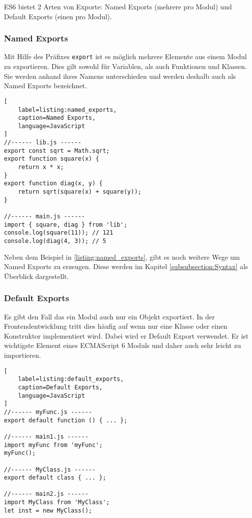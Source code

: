 ES6 bietet 2 Arten von Exporte: Named Exports (mehrere pro Modul) und Default Exports (einen pro Modul). \autocite{Rauschmayer2014}

\subsubsection{Named Exports}
\label{subsubsection:named_exports}

Mit Hilfe des Präfixes \lstinline{export} ist es möglich mehrere Elemente aus einem Modul zu exportieren. Dies gilt sowohl für Variablen, als auch Funktionen und Klassen. Sie werden anhand ihres Namens unterschieden und werden deshalb auch als Named Exports bezeichnet. \autocite{Rauschmayer2014}

\begin{lstlisting}[
    label=listing:named_exports,
	caption=Named Exports,
	language=JavaScript
]
//------ lib.js ------
export const sqrt = Math.sqrt;
export function square(x) {
    return x * x;
}
export function diag(x, y) {
    return sqrt(square(x) + square(y));
}

//------ main.js ------
import { square, diag } from 'lib';
console.log(square(11)); // 121
console.log(diag(4, 3)); // 5
\end{lstlisting}

Neben dem Beispiel in \ref{listing:named_exports}, gibt es noch weitere Wege um Named Exports zu erzeugen. Diese werden im Kapitel \ref{subsubsection:Syntax} als Überblick dargestellt.

\subsubsection{Default Exports}
\label{subsubsection:default_exports}

Es gibt den Fall das ein Modul auch nur ein Objekt exportiert. In der Frontendentwicklung tritt dies häufig auf wenn nur eine Klasse oder einen Konstruktor implementiert wird. Dabei wird er Default Export verwendet. Er ist wichtigste Element eines ECMAScript 6 Moduls und daher auch sehr leicht zu importieren. \autocite{Rauschmayer2014}

\begin{lstlisting}[
    label=listing:default_exports,
	caption=Default Exports,
	language=JavaScript
]
//------ myFunc.js ------
export default function () { ... };

//------ main1.js ------
import myFunc from 'myFunc';
myFunc();

//------ MyClass.js ------
export default class { ... };

//------ main2.js ------
import MyClass from 'MyClass';
let inst = new MyClass();
\end{lstlisting}

